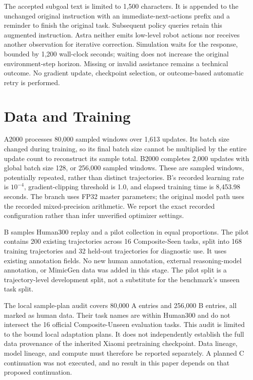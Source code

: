 \documentclass[10pt,twocolumn,letterpaper]{article}
\begin{document}
The accepted subgoal text is limited to 1,500 characters. It is appended to the unchanged original instruction with an immediate-next-actions prefix and a reminder to finish the original task. Subsequent policy queries retain this augmented instruction. Astra neither emits low-level robot actions nor receives another observation for iterative correction. Simulation waits for the response, bounded by 1,200 wall-clock seconds; waiting does not increase the original environment-step horizon. Missing or invalid assistance remains a technical outcome. No gradient update, checkpoint selection, or outcome-based automatic retry is performed.


\section{Data and Training}

A2000 processes 80,000 sampled windows over 1,613 updates. Its batch size changed during training, so its final batch size cannot be multiplied by the entire update count to reconstruct its sample total. B2000 completes 2,000 updates with global batch size 128, or 256,000 sampled windows. These are sampled windows, potentially repeated, rather than distinct trajectories. B's recorded learning rate is $10^{-4}$, gradient-clipping threshold is 1.0, and elapsed training time is 8,453.98 seconds. The branch uses FP32 master parameters; the original model path uses the recorded mixed-precision arithmetic. We report the exact recorded configuration rather than infer unverified optimizer settings.


B samples Human300 replay and a pilot collection in equal proportions. The pilot contains 200 existing trajectories across 16 Composite-Seen tasks, split into 168 training trajectories and 32 held-out trajectories for diagnostic use. It uses existing annotation fields. No new human annotation, external reasoning-model annotation, or MimicGen data was added in this stage. The pilot split is a trajectory-level development split, not a substitute for the benchmark's unseen task split.


The local sample-plan audit covers 80,000 A entries and 256,000 B entries, all marked as human data. Their task names are within Human300 and do not intersect the 16 official Composite-Unseen evaluation tasks. This audit is limited to the bound local adaptation plans. It does not independently establish the full data provenance of the inherited Xiaomi pretraining checkpoint. Data lineage, model lineage, and compute must therefore be reported separately. A planned C continuation was not executed, and no result in this paper depends on that proposed continuation.
\end{document}
